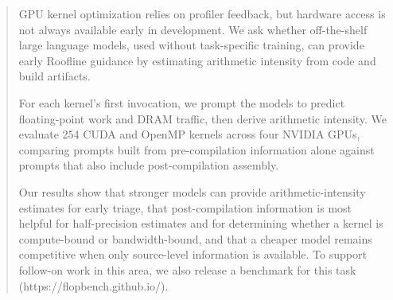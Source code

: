 \documentclass[conference]{IEEEtran}
\begin{document}
\maketitle

\newcommand{\gptoss}{\texttt{GPT-OSS}\xspace}
\newcommand{\opus}{\texttt{Opus-4.6}\xspace}
\newcommand{\gptfivefour}{\texttt{GPT-5.4}\xspace}
\newcommand{\sourceonly}{\textit{source-only}\xspace}
\newcommand{\sourceSASS}{\textit{source+SASS}\xspace}
\newcommand{\pmten}[0]{$\pm10\%$\xspace}
\newcommand{\pmfifty}[0]{$\pm50\%$\xspace}
\newcommand{\bandbound}[0]{BB\xspace}
\newcommand{\compbound}[0]{CB\xspace}


\begin{abstract}
GPU kernel optimization relies on profiler feedback, but hardware access is not always available early in development.
We ask whether off-the-shelf large language models, used without task-specific training, can provide early Roofline guidance by estimating arithmetic intensity from code and build artifacts.

For each kernel's first invocation, we prompt the models to predict floating-point work and DRAM traffic, then derive arithmetic intensity.
We evaluate 254 CUDA and OpenMP kernels across four NVIDIA GPUs, comparing prompts built from pre-compilation information alone against prompts that also include post-compilation assembly.

Our results show that stronger models can provide arithmetic-intensity estimates for early triage, that post-compilation information is most helpful for half-precision estimates and for determining whether a kernel is compute-bound or bandwidth-bound, and that a cheaper model remains competitive when only source-level information is available.
To support follow-on work in this area, we also release a benchmark for this task (https://flopbench.github.io/).
% 
% 


\end{abstract}
\end{document}
